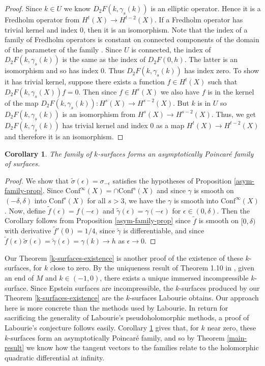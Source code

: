 \documentclass{amsart}
\newtheorem{cor}[thm]{Corollary}
\begin{document}
\begin{proof}
Since $k \in U$ we know $D_2F(k,\gamma_s(k))$ is an elliptic operator. 
Hence it is a Fredholm operator from $H^t(X) \to H^{t-2}(X)$. 
If a Fredholm operator has trivial kernel and index 0, then it is an isomorphism. 
Note that the index of a family of Fredholm operators is constant on connected components of the domain of the parameter of the family \cite[Section 3.7]{lawson-michelsohn1989}. 
Since $U$ is connected, the index of $D_2F(k,\gamma_s(k))$ is the same as the index of $D_2F(0,h)$. 
The latter is an isomorphism and so has index 0. 
Thus $D_2F(k,\gamma_s(k))$ has index zero. 
To show it has trivial kernel, suppose there exists a function $f \in H^t(X)$ such that $D_2F(k,\gamma_s(X))f = 0$. 
Then since $f \in H^s(X)$ we also have $f$ is in the kernel of the map $D_2F(k,\gamma_s(k)): H^s(X) \to H^{s-2}(X)$. 
But $k$ is in $U$ so $D_2F(k,\gamma_s(k))$ is an isomorphism from $H^s(X) \to H^{s-2}(X)$. 
Thus, we get $D_2F(k,\gamma_s(k))$ has trivial kernel and index 0 as a map $H^t(X) \to H^{t-2}(X)$ and therefore it is an isomorphism. 

\end{proof}


\begin{cor}
\label{k-surfaces-parallel}
The family of $k$-surfaces forms an asymptotically Poincar\'e family of surfaces. 
\label{k-surfaces-cor}
\end{cor}

\begin{proof}
We show that $\tilde{\sigma}(\epsilon) = \sigma_{-\epsilon}$ satisfies the hypotheses of Proposition \ref{asym-family-prop}. 
Since $\mathrm{Conf}^\infty(X) = \cap \mathrm{Conf}^s(X)$ and since $\gamma$ is smooth on $(-\delta,\delta)$ into $\mathrm{Conf}^s(X)$ for all $s > 3$, we have the $\gamma$ is smooth into $\mathrm{Conf}^\infty(X)$.
Now, define $\tilde{f}(\epsilon) = f(- \epsilon)$ and $\tilde{\gamma}(\epsilon) = \gamma(-\epsilon)$ for $\epsilon \in (0,\delta)$. 
Then the Corollary follows from Proposition \ref{asym-family-prop} since $\tilde{f}$ is smooth on $[0,\delta)$ with derivative $\tilde{f}'(0) = 1/4$, since $\tilde{\gamma}$ is differentiable, and since $\tilde{f}(\epsilon) \tilde{\sigma}(\epsilon) = \tilde{\gamma}(\epsilon) = \gamma(k) \to h$ as $\epsilon \to 0$.
\end{proof}


Our Theorem \ref{k-surfaces-existence} is another proof of the existence of these $k$-surfaces, for $k$ close to zero. 
By the uniqueness result of Theorem 1.10 in \cite{labourie1992}, given an end of $M$ and $k \in (-1,0)$, there exists a unique immersed incompressible $k$-surface. 
Since Epstein surfaces are incompressible, the $k$-surfaces produced by our Theorem \ref{k-surfaces-existence} are the $k$-surfaces Labourie obtains. 
Our approach here is more concrete than the methods used by Labourie. 
In return for sacrificing the generality of Labourie's pseudoholomorphic methods, a proof of Labourie's conjecture follows easily. 
Corollary \ref{k-surfaces-parallel} gives that, for $k$ near zero, these $k$-surfaces form an asymptotically Poincar\'e family, and so by Theorem \ref{main-result} we know how the tangent vectors to the families relate to the holomorphic quadratic differential at infinity. 
\end{document}

